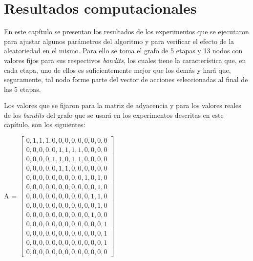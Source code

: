 \chapter{Resultados computacionales}
\label{resul_compu}

En este capítulo se presentan los resultados de los experimentos que se ejecutaron para ajustar algunos parámetros del algoritmo y para verificar el efecto de la aleatoriedad en el mismo. Para ello se toma el grafo de 5 etapas y 13 nodos con valores fijos para sus respectivos \textit{bandits}, los cuales tiene la característica que, en cada etapa, uno de ellos es suficientemente mejor que los demás y hará que, seguramente, tal nodo forme parte  del vector de acciones seleccionadas al final de las 5 etapas. 

Los valores que se fijaron para la matriz de adyacencia y para los valores reales de los \textit{bandits} del grafo que se usará en los experimentos descritas en este capítulo, son los siguientes:

\renewcommand{\arraystretch}{0.5}
A = 
$\begin{bmatrix}

0, 1, 1,  1,  0,  0,  0,  0,  0,  0,  0,  0,  0\\
0, 0, 0,  0,  0,  1,  1,  1,  1,  0,  0,  0,  0\\
0, 0, 0,  0,  1,  1,  0,  1,  1,  0,  0,  0,  0\\
0, 0, 0,  0,  0,  1,  1,  0,  0,  0,  0,  0,  0\\
0, 0, 0,  0,  0,  0,  0,  0,  0,  1,  0,  1,  0\\
0, 0, 0,  0,  0,  0,  0,  0,  0,  0,  0,  1,  0\\
0, 0, 0,  0,  0,  0,  0,  0,  0,  0,  1,  1,  0\\
0, 0, 0,  0,  0,  0,  0,  0,  0,  0,  0,  1,  0\\
0, 0, 0,  0,  0,  0,  0,  0,  0,  0,  1,  0,  0\\
0, 0, 0,  0,  0,  0,  0,  0,  0,  0,  0,  0,  1\\
0, 0, 0,  0,  0,  0,  0,  0,  0,  0,  0,  0,  1\\
0, 0, 0,  0,  0,  0,  0,  0,  0,  0,  0,  0,  1\\
0, 0, 0,  0,  0,  0,  0,  0,  0,  0,  0,  0,  0
\end{bmatrix}$


